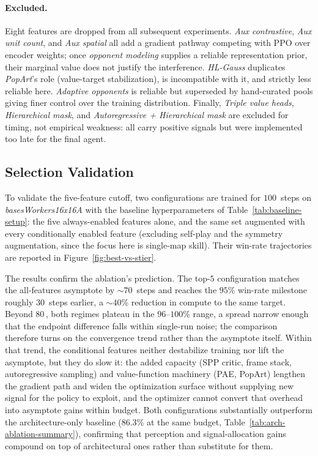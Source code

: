 \paragraph{Excluded.}

Eight features are dropped from all subsequent experiments. \emph{Aux contrastive}, \emph{Aux unit count}, and \emph{Aux spatial} all add a gradient pathway competing with PPO over encoder weights; once \emph{opponent modeling} supplies a reliable representation prior, their marginal value does not justify the interference. \emph{HL-Gauss} duplicates \emph{PopArt}'s role (value-target stabilization), is incompatible with it, and strictly less reliable here. \emph{Adaptive opponents} is reliable but superseded by hand-curated pools giving finer control over the training distribution. Finally, \emph{Triple value heads}, \emph{Hierarchical mask}, and \emph{Autoregressive + Hierarchical mask} are excluded for timing, not empirical weakness: all carry positive signals but were implemented too late for the final agent.

\subsection{Selection Validation}
\label{sec:feat-validation}

To validate the five-feature cutoff, two configurations are trained for $100$\, steps on \textit{basesWorkers16x16A} with the baseline hyperparameters of Table~\ref{tab:baseline-setup}: the five always-enabled features alone, and the same set augmented with every conditionally enabled feature (excluding self-play and the symmetry augmentation, since the focus here is single-map skill). Their win-rate trajectories are reported in Figure~\ref{fig:best-vs-stier}.

The results confirm the ablation's prediction. The top-$5$ configuration matches the all-features asymptote by ${\sim}70$\, steps and reaches the $95$\% win-rate milestone roughly $30$\, steps earlier, a ${\sim}40$\% reduction in compute to the same target. Beyond $80$\,, both regimes plateau in the $96$--$100$\% range, a spread narrow enough that the endpoint difference falls within single-run noise; the comparison therefore turns on the convergence trend rather than the asymptote itself. Within that trend, the conditional features neither destabilize training nor lift the asymptote, but they do slow it: the added capacity (SPP critic, frame stack, autoregressive sampling) and value-function machinery (PAE, PopArt) lengthen the gradient path and widen the optimization surface without supplying new signal for the policy to exploit, and the optimizer cannot convert that overhead into asymptote gains within budget. Both configurations substantially outperform the architecture-only baseline ($86.3$\% at the same budget, Table~\ref{tab:arch-ablation-summary}), confirming that perception and signal-allocation gains compound on top of architectural ones rather than substitute for them.

